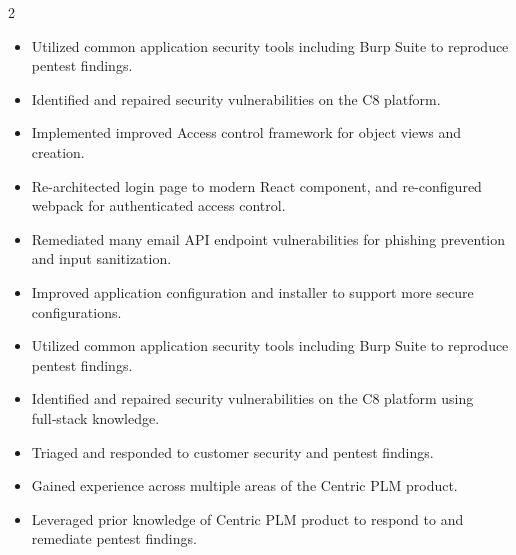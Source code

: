 \documentclass[10pt,a4paper,withhyper]{altacv}
\newif\ifcentricmulti
\begin{document}
\begin{paracol}{2}

\ifcentricmulti
{}
\begin{itemize}
\item Utilized common application security tools including Burp Suite to reproduce pentest findings.
\item Identified and repaired security vulnerabilities on the C8 platform.
\item Implemented improved Access control framework for object views and creation.
\item Re-architected login page to modern React component, and re-configured webpack for authenticated access control.
\item Remediated many email API endpoint vulnerabilities for phishing prevention and input sanitization.
\item Improved application configuration and installer to support more secure configurations.
\end{itemize}

\divider

\begin{itemize}
\item Utilized common application security tools including Burp Suite to reproduce pentest findings.
\item Identified and repaired security vulnerabilities on the C8 platform using full‑stack knowledge.
\item Triaged and responded to customer security and pentest findings.
\item Gained experience across multiple areas of the Centric PLM product.
\item Leveraged prior knowledge of Centric PLM product to respond to and remediate pentest findings.
\end{itemize}

\divider


\end{paracol}
\end{document}
